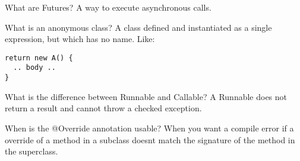 \begin{flashcard}[Concurrency]{What are Futures?}
A way to execute asynchronous calls.
\end{flashcard}

\begin{flashcard}[Lang]{What is an anonymous class?}
A class defined and instantiated as a single expression, but which has no name. Like:
\begin{lstlisting}[frame=single]
return new A() {
  .. body ..
}
\end{lstlisting}
\end{flashcard}

\begin{flashcard}[Concurrency]{What is the difference between Runnable and Callable?}
A Runnable does not return a result and cannot throw a checked exception.
\end{flashcard}

\begin{flashcard}[Lang]{When is the @Override annotation usable?}
When you want a compile error if a override of a method in a subclass doesnt match the signature of the method in the superclass.
\end{flashcard}

